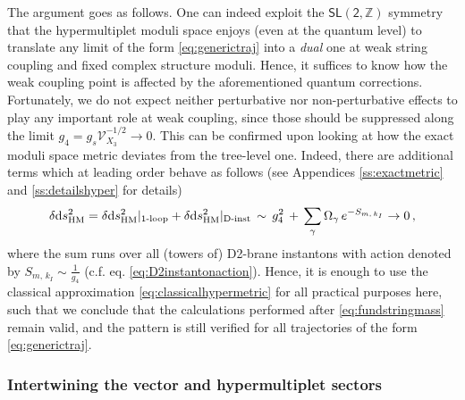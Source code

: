 The argument goes as follows. One can indeed exploit the $\mathsf{SL(2,\mathbb{Z})}$ symmetry that the hypermultiplet moduli space enjoys (even at the quantum level) to translate any limit of the form \eqref{eq:generictraj} into a \emph{dual} one at weak string coupling and fixed complex structure moduli. Hence, it suffices to know how the weak coupling point is affected by the aforementioned quantum corrections. Fortunately, we do not expect neither perturbative nor non-perturbative effects to play any important role at weak coupling, since those should be suppressed along the limit $g_4=g_s \mathcal{V}_{X_3}^{-1/2} \to 0$. This can be confirmed upon looking at how the exact moduli space metric deviates from the tree-level one. Indeed, there are additional terms which at leading order behave as follows \cite{Gunther:1998sc,Becker:1995kb} (see Appendices \ref{ss:exactmetric} and \ref{ss:detailshyper} for details) 
%
\begin{equation}
	\delta  {\rm d} s_{\rm HM}^2 =  \delta  {\rm d} s_{\rm HM}^2\rvert_{\text{1-loop}} + \delta  {\rm d} s_{\rm HM}^2\rvert_{\text{D-inst}}\, \sim\, g_4^2\, +\, \sum_{\gamma} \Omega_{\gamma}\, e^{-S_{m,\, k_I}} \to 0\, ,
\end{equation}
%
where the sum runs over all (towers of) D2-brane instantons with action denoted by $S_{m,\, k_I} \sim \frac{1}{g_4}$ (c.f. eq. \eqref{eq:D2instantonaction}). Hence, it is enough to use the classical approximation \eqref{eq:classicalhypermetric} for all practical purposes here, such that we conclude that the calculations performed after \eqref{eq:fundstringmass} remain valid, and the pattern is still verified for all trajectories of the form \eqref{eq:generictraj}.		
	
\subsubsection{Intertwining the vector and hypermultiplet sectors}
\label{sss:mixedlimits}
	
